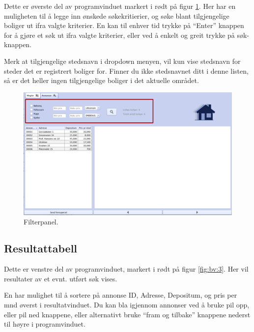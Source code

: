 Dette er øverste del av programvinduet markert i rødt på figur \ref{fig:bv:2}. Her har en muligheten til å
legge inn ønskede søkekritierier, og søke blant tilgjengelige boliger ut ifra valgte kriterier.
En kan til enhver tid trykke på “Enter” knappen for å gjøre et søk ut ifra valgte kriterier, eller ved å
enkelt og greit trykke på søk-knappen.

Merk at tilgjengelige stedsnavn i dropdown menyen, vil kun vise stedsnavn for steder det er
registrert boliger for. Finner du ikke stedsnavnet ditt i denne listen, så er det heller ingen
tilgjengelige boliger i det aktuelle området.



\begin{figure}[h!]
 \includegraphics[width=\textwidth,height=\textheight,keepaspectratio]{./img/brukerveiledning/2.png}
 \caption{Filterpanel.}
 \label{fig:bv:2}
\end{figure}




\newpage
\subsection{Resultattabell}
Dette er venstre del av programvinduet, markert i rødt på figur \ref{fig:bv:3}.
Her vil resultater av et evnt. utført søk vises.

En har mulighet til å sortere på annonse ID, Adresse, Depositum, og pris per mnd øverst i
resultatvinduet. Du kan bla igjennom annonser ved å bruke pil opp, eller pil ned knappene, eller
alternativt bruke “fram og tilbake” knappene nederst til høyre i programvinduet.


